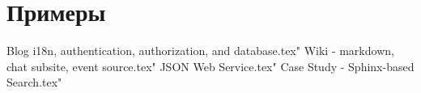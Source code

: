 
\part{Примеры}

 Blog i18n, authentication, authorization, and database.tex"
 Wiki - markdown, chat subsite, event source.tex"
 JSON Web Service.tex"
 Case Study - Sphinx-based Search.tex"


